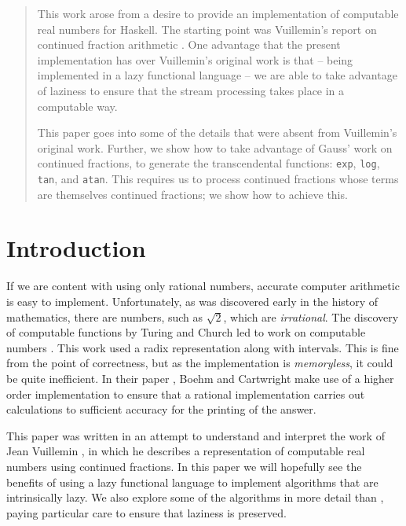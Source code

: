 
\maketitle
\begin{abstract}

This work arose from a desire to provide an implementation of
computable real numbers for {\sc Haskell}. The starting point was
Vuillemin's report on continued fraction arithmetic
. One advantage that the present
implementation has over Vuillemin's original work is that -- being
implemented in a lazy functional language -- we are able to take
advantage of laziness to ensure that the stream processing takes place
in a computable way.

This paper goes into some of the details that were absent from
Vuillemin's original work. Further, we show how to take advantage of
Gauss' work on continued fractions, to generate the transcendental
functions: \mbox{\tt exp}, \mbox{\tt log}, \mbox{\tt 
tan}, and \mbox{\tt atan}. This requires us to
process continued fractions whose terms are themselves continued
fractions; we show how to achieve this.

\end{abstract}

\section{Introduction}

If we are content with using only rational numbers, accurate computer
arithmetic is easy to implement. Unfortunately, as was discovered
early in the history of mathematics, there are numbers, such as
$\sqrt{2}$, which are {\em irrational}. The discovery of computable
functions by Turing  and Church
 led to work on computable numbers
\cite{RICE54a,BISHOP85a}. This work used a radix representation along
with intervals. This is fine from the point of correctness, but as the
implementation is {\em memoryless}, it could be quite inefficient.  In
their paper , Boehm and Cartwright make use of a
higher order implementation to ensure that a rational implementation
carries out calculations to sufficient accuracy for the printing of
the answer.

This paper was written in an attempt to understand and interpret the
work of Jean Vuillemin , in which he describes a
representation of computable real numbers using continued fractions.
In this paper we will hopefully see the benefits of using a lazy
functional language to implement algorithms that are intrinsically
lazy.  We also explore some of the algorithms in more detail than
\cite{VUILLEMIN87a}, paying particular care to ensure that laziness is
preserved.

